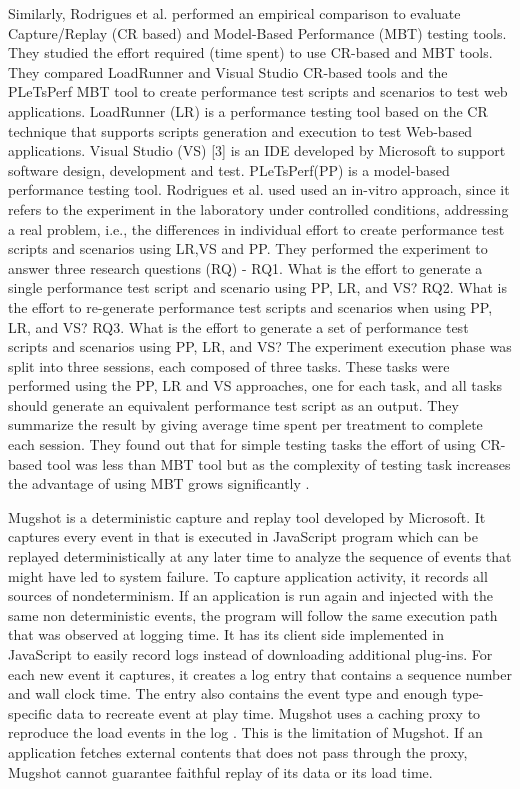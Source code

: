 \documentclass[10pt,journal]{IEEEtran}
\begin{document}
Similarly, Rodrigues et al. performed an empirical comparison to evaluate Capture/Replay (CR based) and Model-Based Performance (MBT) testing tools. They studied the effort required (time spent) to use CR-based and MBT tools. They compared LoadRunner and Visual Studio CR-based tools and the PLeTsPerf MBT tool to create performance test scripts and scenarios to test web applications. LoadRunner (LR) is a performance testing tool based on the CR technique that supports scripts generation and execution to test Web-based applications. Visual Studio (VS) [3] is an IDE developed by Microsoft to support software design, development and test. PLeTsPerf(PP) is a model-based performance testing tool. Rodrigues et al. used used an in-vitro approach, since it refers to the experiment in the laboratory under controlled conditions, addressing a real problem, i.e., the differences in individual effort to create performance test scripts and scenarios using LR,VS and PP. They performed the experiment to answer three research questions (RQ) - RQ1. What is the effort to generate a single performance test script and scenario using PP, LR, and VS? RQ2. What is the effort to re-generate performance test scripts and scenarios when using PP, LR, and VS? RQ3. What is the effort to generate a set of performance test scripts and scenarios using PP, LR, and VS? The experiment execution phase was split into three sessions, each composed of three tasks. These tasks were performed using the PP, LR  and VS approaches, one for each task, and all tasks should generate an equivalent performance test script as an output. They summarize the result by giving average time spent per treatment to complete each session. They found out that for simple testing tasks the effort of using CR-based tool was less than MBT tool but as the complexity of testing task increases the advantage of using MBT grows significantly \cite{Rodrigues:2014:ECR:2652524.2652587}.

Mugshot is a deterministic capture and replay tool developed by Microsoft. It captures every event in  that is executed in JavaScript program which can be replayed deterministically at any later time to analyze the sequence of events that might have led to system failure. To capture application activity, it records all sources of nondeterminism. If an application is run again and injected with the same non deterministic events, the program will follow the same execution path that was observed at logging time. It has its client side implemented in JavaScript to easily record logs instead of downloading additional plug-ins. For each new event it captures, it creates a log entry that contains a sequence number and wall clock time. The entry also contains the event type and enough type-specific data to recreate event at play time. Mugshot uses a caching proxy to reproduce the load events in the log \cite{Mickens:2010:MDC:1855711.1855722}. This is the limitation of Mugshot. If an application fetches external contents that does not pass through the proxy, Mugshot cannot guarantee faithful replay of its data or its load time.
\end{document}

